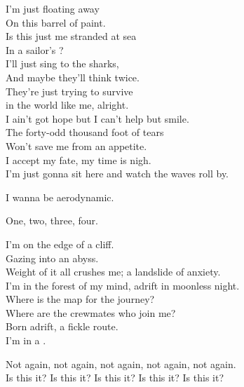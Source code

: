 
I'm just floating away \\
On this barrel of paint. \\
Is this just me stranded at sea \\
In a sailor's ? \\
I'll just sing to the sharks, \\
And maybe they'll think twice. \\

They're just trying to survive \\
in the world like me, alright. \\
I ain't got hope but I can't help but smile. \\
The forty-odd thousand foot of tears \\
Won't save me from an appetite. \\
I accept my fate, my time is nigh. \\
I'm just gonna sit here and watch the waves roll by. \\


I wanna be aerodynamic. \\





One, two, three, four. \\


I'm on the edge of a cliff. \\
Gazing into an abyss. \\
Weight of it all crushes me; a landslide of anxiety. \\
I'm in the forest of my mind, adrift in moonless night. \\
Where is the map for the journey? \\
Where are the crewmates who join me? \\
Born adrift, a fickle route. \\
I'm in a . \\


Not again, not again, not again, not again, not again. \\
Is this it? Is this it? Is this it? Is this it? Is this it? \\

